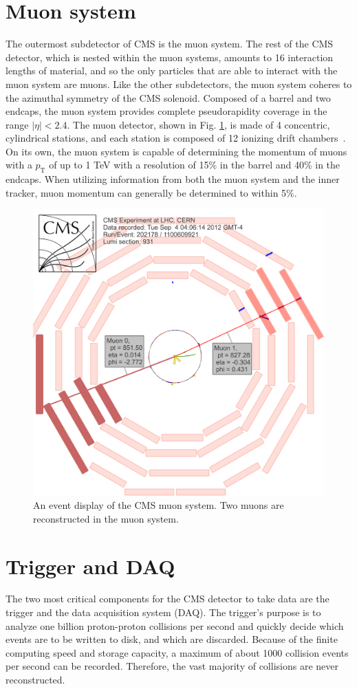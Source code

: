  
\section{Muon system}
The outermost subdetector of CMS is the muon system. The rest of the CMS detector, 
which is nested within the muon systems, amounts to 16 interaction lengths of material, 
and so the only particles that are able to interact with the muon system are muons. Like 
the other subdetectors, the muon system coheres to the azimuthal symmetry of the CMS 
solenoid. Composed of a barrel and two endcaps, the muon system provides complete 
pseudorapidity coverage in the range $|\eta|<2.4.$ The muon detector, shown in Fig. 
\ref{fig:MuonSystem}, is made of 4 concentric, cylindrical stations, and each station is 
composed of 12 ionizing drift chambers~\cite{Breskin:1244506}. On its own, the muon system 
is capable of determining the momentum of muons with a $p_{\text{T}}$ of up to 1 TeV with 
a resolution of 15\% in the barrel and 40\% in the endcaps. When utilizing information from 
both the muon system and the inner tracker, muon momentum can generally be determined 
to within 5\%.
\begin{figure}[h]
\centering
\includegraphics[width=0.5\linewidth]{figures/CMS/MuonSystem.png}
\caption{An event display of the CMS muon system. Two muons are reconstructed in the muon system.} 
\label{fig:MuonSystem}
\end{figure}
\FloatBarrier

\section{Trigger and DAQ}
\label{sec:Trigger}

The two most critical components for the CMS detector to take data are the trigger and the data acquisition system (DAQ).  The trigger's purpose is to analyze one billion proton-proton collisions per second and quickly decide which events are to be written to disk, and which are discarded. Because of the finite computing speed and storage capacity, a maximum of about 1000 collision events per second can be recorded. Therefore, the vast majority of collisions are never reconstructed.

